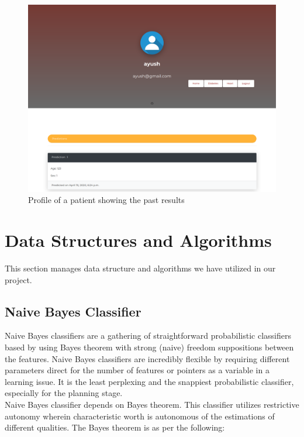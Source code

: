 \documentclass[oneside,12pt]{Classes/VTU}
\begin{document}
    			\begin{figure}
    				\begin{center}
    				\includegraphics[width=17cm]{Screenshots/profile.PNG}
    				\caption{Profile of a patient showing the past results}
    				\end{center}
    			\end{figure}
    
    \pagebreak
    \section{Data Structures and Algorithms}
    	This section manages data structure and algorithms we have utilized in our project.
    	
    \subsection{Naive Bayes Classifier}
    	Naive Bayes classifiers are a gathering of straightforward probabilistic classifiers based by using Bayes theorem with strong (naive) freedom suppositions between the features. Naive Bayes classifiers are incredibly flexible by requiring different parameters direct for the number of features or pointers as a variable in a learning issue. It is the least perplexing and the snappiest probabilistic classifier, especially for the planning stage.\\ 
    	
    	Naive Bayes classifier depends on Bayes theorem. This classifier utilizes restrictive autonomy wherein characteristic worth is autonomous of the estimations of different qualities. The Bayes theorem is as per the following: 
    	
\end{document}
